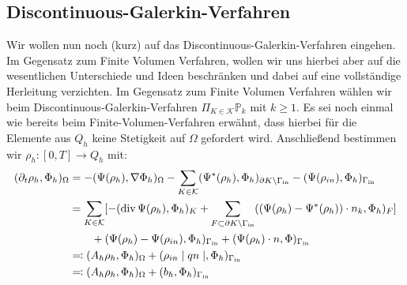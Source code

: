 \subsection{Discontinuous-Galerkin-Verfahren}
Wir wollen nun noch (kurz) auf das Discontinuous-Galerkin-Verfahren eingehen. Im Gegensatz zum Finite Volumen Verfahren, wollen wir uns hierbei aber auf die wesentlichen Unterschiede und Ideen beschränken und dabei auf eine vollständige Herleitung verzichten. \newline
Im Gegensatz zum Finite Volumen Verfahren wählen wir beim Discontinuous-Galerkin-Verfahren $\Pi_{K\in\mathcal{K}} \mathbb{P}_k $ mit $ k \geq 1 $. Es sei noch einmal wie bereits beim Finite-Volumen-Verfahren erwähnt, dass hierbei für die Elemente aus $Q_h$ keine Stetigkeit auf $\Omega$ gefordert wird. \newline
Anschließend bestimmen wir $\rho_h : [0,T] \rightarrow Q_h$ mit:
	\begin{align*}
		(\partial_t \rho_h , \Phi_h)_{\Omega} &= -(\Psi(\rho_h),\nabla \Phi_h)_{\Omega}
		- \sum_{K \in \mathcal{K}}(\Psi^*(\rho_h),\Phi_h)_{\partial K \setminus \Gamma_{{\text{in}}}}
		-(\Psi(\rho_{in}),\Phi_h)_{\Gamma_{{\text{in}}}} \\
		&= \sum_{K \in \mathcal{K}} [ -( \operatorname{div} \Psi (\rho_h),\Phi_h)_{K}
		+ \sum_{ F \subset \partial K \setminus \Gamma_{{\text{in}}}} ((\Psi(\rho_h)-\Psi ^* (\rho_h)) \cdot n_k , \Phi_h)_F ] \\		
		&\qquad +(\Psi(\rho_h) - \Psi(\rho_{in}),\Phi_h)_{\Gamma_{{\text{in}}}} 
		+ ( \Psi(\rho_h) \cdot n , \Phi )_{ \Gamma_{{\text{in}}} } \\
		&\eqqcolon  (A_h \rho_h, \Phi_h )_{\Omega} + (\rho_{in} \mid qn \mid ,\Phi_h)_{\Gamma_{{\text{in}}}} \\
		&\eqqcolon (A_h \rho_h, \Phi_h )_{\Omega} + (b_h,\Phi_h)_{\Gamma_{{\text{in}}}}
	\end{align*}  
